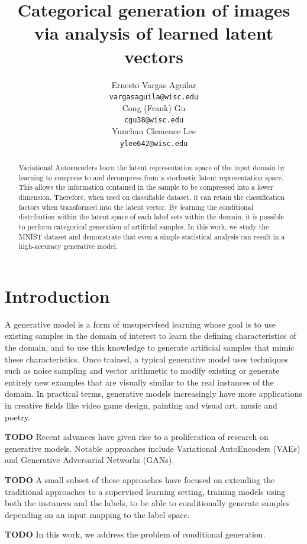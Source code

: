\documentclass{article}
\title{Categorical generation of images via analysis of learned latent vectors}
\author{
  Ernesto Vargas Aguilar \\
  \texttt{vargasaguila@wisc.edu} \\
   \And
   Cong (Frank) Gu \\
   \texttt{cgu38@wisc.edu} \\
   \And
   Yunchan Clemence Lee \\
   \texttt{ylee642@wisc.edu} \\
}
\begin{document}

\maketitle

\begin{abstract}
Variational Autoencoders learn the latent representation space of the input domain by learning to compress to and decompress from a stochastic latent representation space. This allows the information contained in the sample to be compressed into a lower dimension. Therefore, when used on classifiable dataset, it can retain the classification factors when transformed into the latent vector. By learning the conditional distribution within the latent space of each label sets within the domain, it is possible to perform categorical generation of artificial samples. In this work, we study the MNIST dataset and demonstrate that even a simple statistical analysis can result in a high-accuracy generative model.
\end{abstract}

\section{Introduction}

A generative model is a form of unsupervised learning whose goal is to use existing 
samples in the domain of interest to learn the defining characteristics of the domain,
and to use this knowledge to generate artificial samples that mimic these characteristics.
Once trained, a typical generative model uses techniques such as noise sampling and vector arithmetic
to modify existing or generate entirely new examples that are visually similar to the real instances of the domain.
In practical terms, generative models increasingly have more applications in creative fields like video game design, 
painting and visual art, music and poetry. \par

\textbf{TODO} Recent advances have given rise to a proliferation of research on generative models. Notable approaches include Variational AutoEncoders (VAEs) and Generative Adversarial Networks (GANs). \par
\textbf{TODO} A small subset of these approaches have focused on extending the traditional approaches to a supervised learning setting, training models using both the instances and the labels, to be able to conditionally generate samples depending on an input mapping to the label space.\par
\textbf{TODO} In this work, we address the problem of conditional generation.
\end{document}
